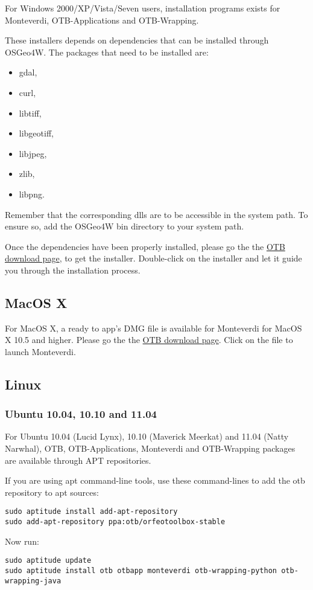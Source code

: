 For Windows 2000/XP/Vista/Seven users, installation programs exists for Monteverdi, 
OTB-Applications and OTB-Wrapping. 

These installers depends on dependencies that can be installed through OSGeo4W. The packages that
need to be installed are:
\begin{itemize}
\item gdal,
\item curl, 
\item libtiff,
\item libgeotiff,
\item libjpeg,
\item zlib, 
\item libpng.
\end{itemize}
Remember that the corresponding dlls are to be accessible in the system path. To ensure so, add
the OSGeo4W bin directory to your system path.

 Once the dependencies have been properly installed, please go the the 
\href{http://sourceforge.net/projects/orfeo-toolbox/}{OTB download page}, to
get the installer. Double-click on the installer and let it guide you through the 
installation process.

\subsection{MacOS X}
\label{ssec:mac_binaries}

For MacOS X, a ready to app's DMG file is available for Monteverdi for MacOS X 10.5 and higher. 
Please go the the \href{http://sourceforge.net/projects/orfeo-toolbox/}{OTB download page}.
Click on the file to launch Monteverdi.

\subsection{Linux}

\subsubsection{Ubuntu 10.04, 10.10 and 11.04}
\label{ssec:ubuntu_binaries}
For Ubuntu 10.04 (Lucid Lynx), 10.10 (Maverick Meerkat) and 11.04 (Natty Narwhal), OTB, 
OTB-Applications, Monteverdi and OTB-Wrapping packages are available through APT repositories.

If you are using apt command-line tools, use these command-lines to add the otb repository to apt sources:
\begin{verbatim}
sudo aptitude install add-apt-repository 
sudo add-apt-repository ppa:otb/orfeotoolbox-stable
\end{verbatim}
Now run:
\begin{verbatim}
sudo aptitude update
sudo aptitude install otb otbapp monteverdi otb-wrapping-python otb-wrapping-java
\end{verbatim}


